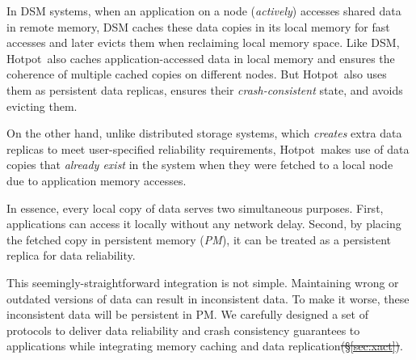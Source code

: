 \documentclass[sigconf]{acmart}
\renewcommand{\em}{\it}
\newcommand{\nvm}{PM}
\newcommand{\hotpot}{Hotpot}
\providecommand{\DIFdel}[1]{{\protect\color{red}\sout{#1}}}                      %
\providecommand{\DIFdelbegin}{} %
\providecommand{\DIFdelend}{} %
\begin{document}
In DSM systems, when an application on a node ({\em actively}) accesses shared data in remote memory,
DSM caches these data copies in its local memory for fast accesses
and later evicts them when reclaiming local memory space.
Like DSM, \hotpot\ also caches application-accessed data in local memory
and ensures the coherence of multiple cached copies on different nodes.
But \hotpot\ also uses them as persistent data replicas, ensures their {\em crash-consistent} state,
and avoids evicting them.

On the other hand, unlike distributed storage systems, which {\em creates} extra data replicas 
to meet user-specified reliability requirements, 
\hotpot\ makes use of data copies that {\em already exist} in the system when
they were fetched to a local node due to application memory accesses.

In essence, every local copy of data serves two simultaneous purposes.
First, applications can access it locally without any network delay.
Second, by placing the fetched copy in persistent memory ({\em \nvm}), it can be treated as a persistent replica 
for data reliability.

This seemingly-straightforward integration is not simple. 
Maintaining wrong or outdated versions of data can result in inconsistent data.
To make it worse, these inconsistent data will be persistent in \nvm.
We carefully designed a set of protocols to deliver data reliability and crash consistency guarantees 
to applications while integrating memory caching and data replication\DIFdelbegin \DIFdel{(\S\ref{sec:xact})}\DIFdelend .
\end{document}
